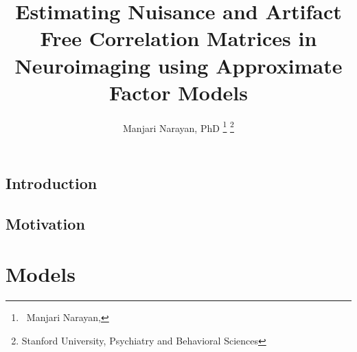 \documentclass[nocrop,final,onecolumn,openacc]{bluetechreport}
\begin{document}
\title{
Estimating Nuisance and Artifact Free Correlation Matrices in Neuroimaging using Approximate Factor Models
}

\author{%
\centering
Manjari Narayan, PhD
\footnote{\ 
Manjari Narayan, 
}
\footnote{Stanford University, Psychiatry and Behavioral Sciences}
} 

\address{
}




\begin{abstract}

\end{abstract}


\begin{fmtext}

\section{Introduction}\label{sec:introduction}
\subsection{Motivation}

\end{fmtext}

\maketitle
\newpage

\section{Models}
\end{document}
